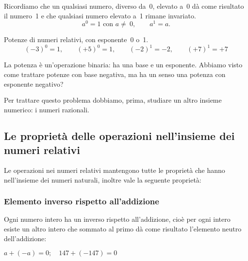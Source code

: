 
Ricordiamo che un qualsiasi numero, diverso da~0, elevato a~0 dà come 
risultato 
il numero~1 e che qualsiasi
numero elevato a~1 rimane invariato.
\[a^0=1\text{ con }a\neq~0,\qquad a^1=a.\]
 \begin{esempio}
 Potenze di numeri relativi, con esponente~0 o~1.
\[(-3)^0=1,\qquad (+5)^0=1, \qquad (-2)^1=-2, \qquad (+7)^1=+7 \]
 \end{esempio}

\begin{osservazione}
La potenza è un'operazione binaria: ha una base e un esponente. Abbiamo 
visto come trattare potenze con base negativa, ma ha un senso una potenza 
con esponente negativo?

Per trattare questo problema dobbiamo, prima, studiare un altro insieme 
numerico: i numeri razionali.
\end{osservazione}



\subsection{Le proprietà delle operazioni nell'insieme dei numeri relativi}

Le operazioni nei numeri relativi mantengono tutte le proprietà che hanno 
nell'insieme dei numeri naturali, inoltre vale la seguente proprietà:

\subsubsection{Elemento inverso rispetto all'addizione}

Ogni numero intero ha un inverso rispetto all'addizione, cioè per ogni 
intero 
esiste un altro intero che sommato al primo dà come risultato l'elemento 
neutro 
dell'addizione:

\(a + (-a) = 0; \quad 147 + (-147) = 0\)

